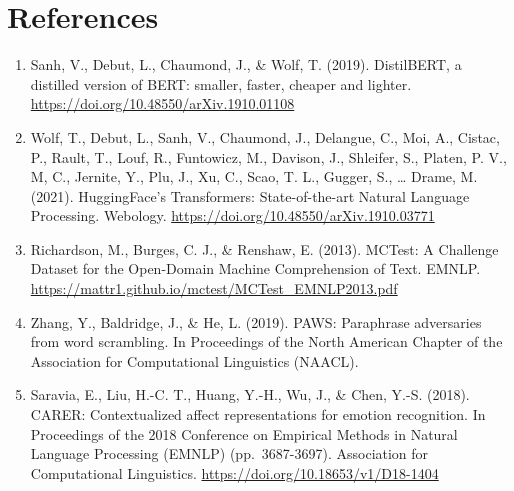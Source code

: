 \documentclass[
  11pt,
]{article}
\begin{document}
\hypertarget{references}{%
\section{References}\label{references}}

\begin{enumerate}
\def\labelenumi{\arabic{enumi}.}
\item
  Sanh, V., Debut, L., Chaumond, J., \& Wolf, T. (2019). DistilBERT, a
  distilled version of BERT: smaller, faster, cheaper and lighter.
  \url{https://doi.org/10.48550/arXiv.1910.01108}
\item
  Wolf, T., Debut, L., Sanh, V., Chaumond, J., Delangue, C., Moi, A.,
  Cistac, P., Rault, T., Louf, R., Funtowicz, M., Davison, J., Shleifer,
  S., Platen, P. V., M, C., Jernite, Y., Plu, J., Xu, C., Scao, T. L.,
  Gugger, S., \ldots{} Drame, M. (2021). HuggingFace's Transformers:
  State-of-the-art Natural Language Processing. Webology.
  \url{https://doi.org/10.48550/arXiv.1910.03771}
\item
  Richardson, M., Burges, C. J., \& Renshaw, E. (2013). MCTest: A
  Challenge Dataset for the Open-Domain Machine Comprehension of Text.
  EMNLP. \url{https://mattr1.github.io/mctest/MCTest_EMNLP2013.pdf}
\item
  Zhang, Y., Baldridge, J., \& He, L. (2019). PAWS: Paraphrase
  adversaries from word scrambling. In Proceedings of the North American
  Chapter of the Association for Computational Linguistics (NAACL).
\item
  Saravia, E., Liu, H.-C. T., Huang, Y.-H., Wu, J., \& Chen, Y.-S.
  (2018). CARER: Contextualized affect representations for emotion
  recognition. In Proceedings of the 2018 Conference on Empirical
  Methods in Natural Language Processing (EMNLP) (pp.~3687-3697).
  Association for Computational Linguistics.
  \url{https://doi.org/10.18653/v1/D18-1404}
\end{enumerate}
\end{document}
